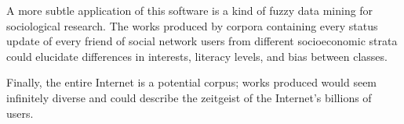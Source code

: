 \documentclass[10pt]{article}
\begin{document}
A more subtle application of this software is a kind of fuzzy data mining for
sociological research. The works produced by corpora containing every status
update of every friend of social network users from different socioeconomic
strata could elucidate differences in interests, literacy levels, and bias
between classes.

Finally, the entire Internet is a potential corpus; works
produced would seem infinitely diverse and could describe the zeitgeist of the
Internet's billions of users.



\end{document}
